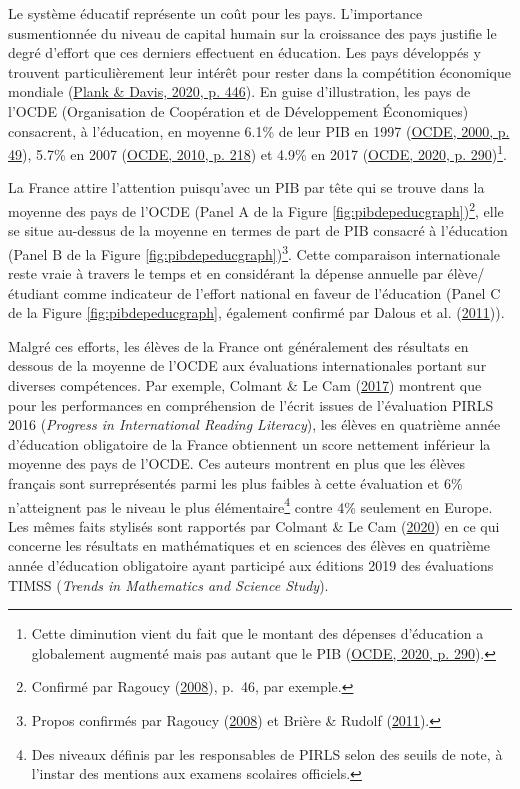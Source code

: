 \documentclass[
]{book}
\begin{document}
Le système éducatif représente un coût pour les pays. L'importance susmentionnée du niveau de capital humain sur la croissance des pays justifie le degré d'effort que ces derniers effectuent en éducation. Les pays développés y trouvent particulièrement leur intérêt pour rester dans la compétition économique mondiale (\protect\hyperlink{ref-PLA:DAV:20}{Plank \& Davis, 2020, p. 446}). En guise d'illustration, les pays de l'OCDE (Organisation de Coopération et de Développement Économiques) consacrent, à l'éducation, en moyenne 6.1\% de leur PIB en 1997 (\protect\hyperlink{ref-OCDR:00}{OCDE, 2000, p. 49}), 5.7\% en 2007 (\protect\hyperlink{ref-OCDR:10}{OCDE, 2010, p. 218}) et 4.9\% en 2017 (\protect\hyperlink{ref-OCDR:20}{OCDE, 2020, p. 290})\footnote{Cette diminution vient du fait que le montant des dépenses d'éducation a globalement augmenté mais pas autant que le PIB (\protect\hyperlink{ref-OCDR:20}{OCDE, 2020, p. 290}).}.

\quad La France attire l'attention puisqu'avec un PIB par tête qui se trouve dans la moyenne des pays de l'OCDE (Panel A de la Figure \ref{fig:pibdepeducgraph})\footnote{Confirmé par Ragoucy (\protect\hyperlink{ref-RAG:08}{2008}), p.~46, par exemple.}, elle se situe au-dessus de la moyenne en termes de part de PIB consacré à l'éducation (Panel B de la Figure \ref{fig:pibdepeducgraph})\footnote{Propos confirmés par Ragoucy (\protect\hyperlink{ref-RAG:08}{2008}) et Brière \& Rudolf (\protect\hyperlink{ref-BRI:RUD:11}{2011}).}. Cette comparaison internationale reste vraie à travers le temps et en considérant la dépense annuelle par élève/étudiant comme indicateur de l'effort national en faveur de l'éducation (Panel C de la Figure \ref{fig:pibdepeducgraph}, également confirmé par Dalous et al. (\protect\hyperlink{ref-DAL:eal:11}{2011})).

Malgré ces efforts, les élèves de la France ont généralement des résultats en dessous de la moyenne de l'OCDE aux évaluations internationales portant sur diverses compétences. Par exemple, Colmant \& Le Cam (\protect\hyperlink{ref-COL:LEC:17}{2017}) montrent que pour les performances en compréhension de l'écrit issues de l'évaluation PIRLS 2016 (\emph{Progress in International Reading Literacy}), les élèves en quatrième année d'éducation obligatoire de la France obtiennent un score nettement inférieur la moyenne des pays de l'OCDE. Ces auteurs montrent en plus que les élèves français sont surreprésentés parmi les plus faibles à cette évaluation et 6\% n'atteignent pas le niveau le plus élémentaire\footnote{Des niveaux définis par les responsables de PIRLS selon des seuils de note, à l'instar des mentions aux examens scolaires officiels.} contre 4\% seulement en Europe. Les mêmes faits stylisés sont rapportés par Colmant \& Le Cam (\protect\hyperlink{ref-COL:LEC:20}{2020}) en ce qui concerne les résultats en mathématiques et en sciences des élèves en quatrième année d'éducation obligatoire ayant participé aux éditions 2019 des évaluations TIMSS (\emph{Trends in Mathematics and Science Study}).
\end{document}

